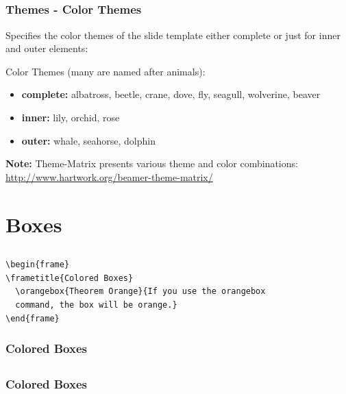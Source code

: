 \documentclass[[newPxFont]{beamer}
\begin{document}
\subsection{}
\begin{frame}
  \frametitle{Themes - Color Themes}
  Specifies the color themes of the slide template either complete or
just for inner and outer elements:
 \begin{block}{Color Themes (many are named after animals):}
   \begin{itemize}
    \item \textbf{complete:} albatross, beetle, crane, dove, fly, seagull, wolverine, beaver
    \item \textbf{ inner:} lily, orchid, rose
  \item \textbf{ outer:} whale, seahorse, dolphin
  \end{itemize}
  \end{block}
  \textbf{\color{red} Note:} Theme-Matrix presents various theme and color combinations:
\url{http://www.hartwork.org/beamer-theme-matrix/}
\end{frame}
\section{Boxes}
\subsection{}
\begin{frame}[fragile=singleslide]
\begin{verbatim}
\begin{frame}
\frametitle{Colored Boxes}
  \orangebox{Theorem Orange}{If you use the orangebox 
  command, the box will be orange.}
\end{frame} 
\end{verbatim}
\frametitle{Colored Boxes}
\end{frame}


\subsection{}
\begin{frame}
\frametitle{Colored Boxes}





\end{frame}
\end{document}
